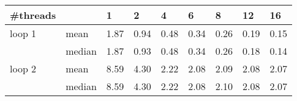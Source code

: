 \begin{tabu}{ll|XXXXXXX}
\#threads & &1 &2 &4 &6 &8 &12 &16 \\
\hline
loop 1 &mean &1.87 &0.94 &0.48 &0.34 &0.26 &0.19 &0.15 \\
       &median &1.87 &0.93 &0.48 &0.34 &0.26 &0.18 &0.14 \\
\hline
loop 2 &mean &8.59 &4.30 &2.22 &2.08 &2.09 &2.08 &2.07 \\
       &median &8.59 &4.30 &2.22 &2.08 &2.10 &2.08 &2.07 \\
\end{tabu}
